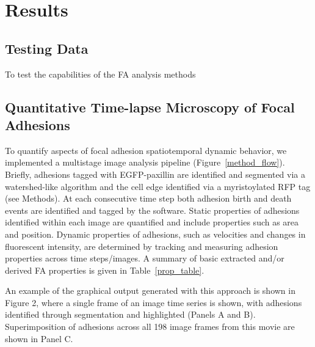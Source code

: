 \documentclass[10pt]{article}
\begin{document}
\section*{Results}

\subsection*{Testing Data}

To test the capabilities of the FA analysis methods 

\subsection*{Quantitative Time-lapse Microscopy of Focal Adhesions}

To quantify aspects of focal adhesion spatiotemporal dynamic behavior, we
implemented a multistage image analysis pipeline (Figure~\ref{method_flow}).
Briefly, adhesions tagged with EGFP-paxillin are identified and segmented via a
watershed-like algorithm and the cell edge identified via a myristoylated  RFP
tag (see Methods).  At each consecutive time step both adhesion birth and death
events are identified and tagged by the software. Static properties of adhesions
identified within each image are quantified and include properties such as area
and position. Dynamic properties of adhesions, such as velocities and changes in
fluorescent intensity, are determined by tracking and measuring adhesion
properties across time steps/images. A summary of basic extracted and/or derived
FA properties is given in Table~\ref{prop_table}.

An example of the graphical output generated with this approach is shown in
Figure 2, where a single frame of an image time series is shown, with adhesions
identified through segmentation and highlighted (Panels A and B).
Superimposition of adhesions across all 198 image frames from this movie are
shown in Panel C.     
\end{document}
